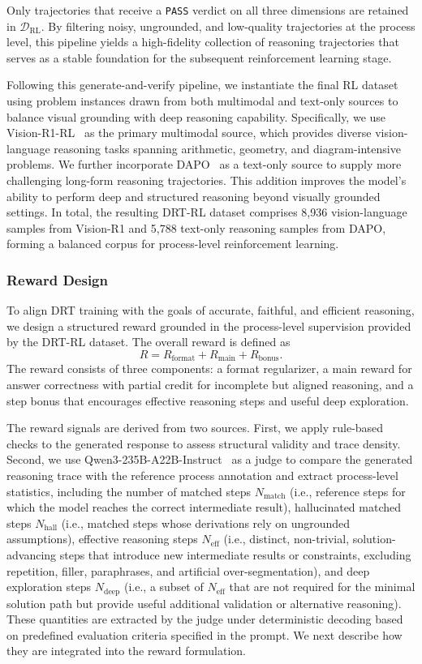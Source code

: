 Only trajectories that receive a \texttt{PASS} verdict on all three dimensions are retained in $\mathcal{D}_{\text{RL}}$. By filtering noisy, ungrounded, and low-quality trajectories at the process level, this pipeline yields a high-fidelity collection of reasoning trajectories that serves as a stable foundation for the subsequent reinforcement learning stage.

Following this generate-and-verify pipeline, we instantiate the final RL dataset using problem instances drawn from both multimodal and text-only sources to balance visual grounding with deep reasoning capability. Specifically, we use Vision-R1-RL~\cite{huang2025vision} as the primary multimodal source, which provides diverse vision-language reasoning tasks spanning arithmetic, geometry, and diagram-intensive problems. We further incorporate DAPO~\cite{yu2025dapo} as a text-only source to supply more challenging long-form reasoning trajectories. This addition improves the model's ability to perform deep and structured reasoning beyond visually grounded settings. In total, the resulting DRT-RL dataset comprises 8,936 vision-language samples from Vision-R1 and 5,788 text-only reasoning samples from DAPO, forming a balanced corpus for process-level reinforcement learning.

\subsubsection{Reward Design}\label{reward}
To align DRT training with the goals of accurate, faithful, and efficient reasoning, we design a structured reward grounded in the process-level supervision provided by the DRT-RL dataset. The overall reward is defined as
\[
R = R_{\text{format}} + R_{\text{main}} + R_{\text{bonus}}.
\]
The reward consists of three components: a format regularizer, a main reward for answer correctness with partial credit for incomplete but aligned reasoning, and a step bonus that encourages effective reasoning steps and useful deep exploration.

The reward signals are derived from two sources. First, we apply rule-based checks to the generated response to assess structural validity and trace density. Second, we use Qwen3-235B-A22B-Instruct~\cite{bai2025qwen3} as a judge to compare the generated reasoning trace with the reference process annotation and extract process-level statistics, including the number of matched steps $N_{\text{match}}$ (i.e., reference steps for which the model reaches the correct intermediate result), hallucinated matched steps $N_{\text{hall}}$ (i.e., matched steps whose derivations rely on ungrounded assumptions), effective reasoning steps $N_{\text{eff}}$ (i.e., distinct, non-trivial, solution-advancing steps that introduce new intermediate results or constraints, excluding repetition, filler, paraphrases, and artificial over-segmentation), and deep exploration steps $N_{\text{deep}}$ (i.e., a subset of $N_{\text{eff}}$ that are not required for the minimal solution path but provide useful additional validation or alternative reasoning). These quantities are extracted by the judge under deterministic decoding based on predefined evaluation criteria specified in the prompt. We next describe how they are integrated into the reward formulation.

